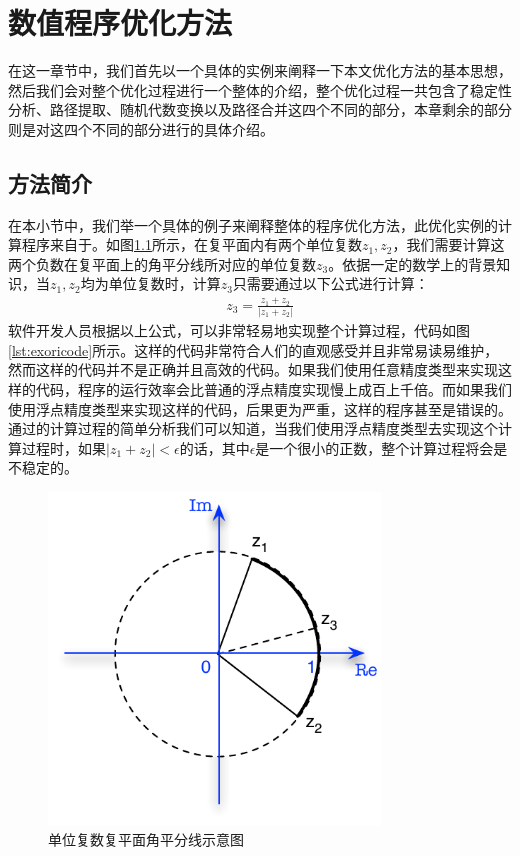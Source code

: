 \chapter{数值程序优化方法}\label{chapter_framework}

在这一章节中，我们首先以一个具体的实例来阐释一下本文优化方法的基本思想，然后我们会对整个优化过程进行一个整体的介绍，整个优化过程一共包含了稳定性分析、路径提取、随机代数变换以及路径合并这四个不同的部分，本章剩余的部分则是对这四个不同的部分进行的具体介绍。

\section{方法简介}
在本小节中，我们举一个具体的例子来阐释整体的程序优化方法，此优化实例的计算程序来自于\cite{doi:10.1137/08074218X}。如图\ref{fig:midarc}所示，在复平面内有两个单位复数$z_1,z_2$，我们需要计算这两个负数在复平面上的角平分线所对应的单位复数$z_3$。依据一定的数学上的背景知识，当$z_1,z_2$均为单位复数时，计算$z_3$只需要通过以下公式进行计算：
\begin{gather*}\label{eq:fpex}
    z_3=\frac{z_1+z_2}{\left|z_1+z_2\right|}
\end{gather*}
软件开发人员根据以上公式，可以非常轻易地实现整个计算过程，代码如图\ref{lst:exoricode}所示。这样的代码非常符合人们的直观感受并且非常易读易维护，然而这样的代码并不是正确并且高效的代码。如果我们使用任意精度类型来实现这样的代码，程序的运行效率会比普通的浮点精度实现慢上成百上千倍。而如果我们使用浮点精度类型来实现这样的代码，后果更为严重，这样的程序甚至是错误的。通过的计算过程的简单分析我们可以知道，当我们使用浮点精度类型去实现这个计算过程时，如果$|z_1+z_2| < \epsilon$的话，其中$\epsilon$是一个很小的正数，整个计算过程将会是不稳定的。

\begin{figure}[thbp]
   \centering
   \includegraphics[width=88mm]{fig/ExampleArc_formal.pdf}
   \caption{单位复数复平面角平分线示意图} \label{fig:midarc}
\end{figure}


